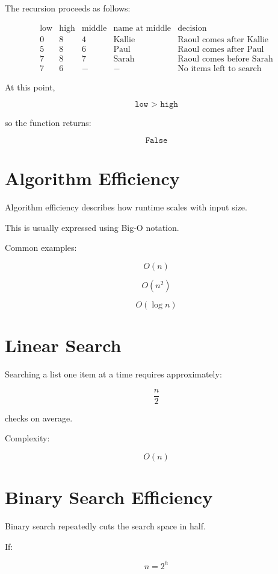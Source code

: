 \documentclass[11pt]{article}
\begin{document}
The recursion proceeds as follows:

\[
\begin{array}{c|c|c|c|c}
\text{low} & \text{high} & \text{middle} & \text{name at middle} & \text{decision} \\
\hline
0 & 8 & 4 & \text{Kallie} & \text{Raoul comes after Kallie} \\
5 & 8 & 6 & \text{Paul} & \text{Raoul comes after Paul} \\
7 & 8 & 7 & \text{Sarah} & \text{Raoul comes before Sarah} \\
7 & 6 & - & - & \text{No items left to search}
\end{array}
\]

At this point,

\[
\texttt{low > high}
\]

so the function returns:

\[
\texttt{False}
\]

\section{Algorithm Efficiency}

Algorithm efficiency describes how runtime scales with input size.

This is usually expressed using Big-O notation.

Common examples:

\[
O(n)
\]

\[
O(n^2)
\]

\[
O(\log n)
\]

\section{Linear Search}

Searching a list one item at a time requires approximately:

\[
\frac{n}{2}
\]

checks on average.

Complexity:

\[
O(n)
\]

\section{Binary Search Efficiency}

Binary search repeatedly cuts the search space in half.

If:

\[
n = 2^h
\]
\end{document}
